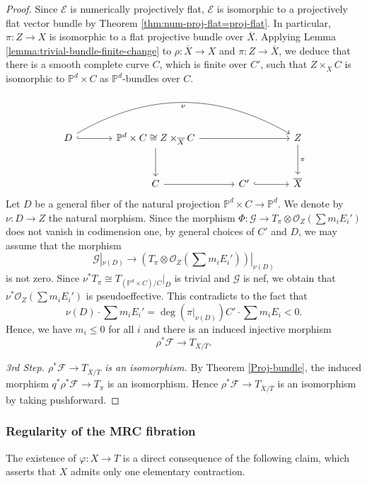 \documentclass[english,reqno]{amsart}
\newcommand\bbP{{\mathbb P}}
\newcommand\sE{{\mathscr E}}
\newcommand\sF{{\mathscr F}}
\newcommand\sG{{\mathscr G}}
\newcommand\sO{{\mathscr O}}
\theoremstyle{plain}
\theoremstyle{definition}
\numberwithin{equation}{section} %
\begin{document}
\begin{proof}
	Since $\sE$ is numerically projectively flat, $\sE$ is isomorphic to a projectively flat vector bundle by Theorem \ref{thm:num-proj-flat=proj-flat}. In particular, $\pi\colon Z\rightarrow X$ is isomorphic to a flat projective bundle over $\overline{X}$. Applying Lemma \ref{lemma:trivial-bundle-finite-change} to $\rho\colon \overline{X}\rightarrow X$ and $\pi\colon Z\rightarrow \overline{X}$, we deduce that there is a smooth complete curve $C$, which is finite over $C'$, such that  $Z\times_{\overline{X}} C$ is isomorphic to $\mathbb{P}^d\times C$ as $\bbP^d$-bundles over $C$.
	\[
	\begin{tikzcd}[column sep=large, row sep=large]
	D \arrow[bend left]{rrr}[swap]{\nu}\arrow[r,hookrightarrow] &  \mathbb{P}^d\times C \cong Z\times_{\overline{X}} C \arrow[rr] \dar & & Z \dar{\pi}\\
	& C  \rar & C' \arrow[r,hookrightarrow] &  \overline{X}
	\end{tikzcd}
	\]
	Let $D$ be a general fiber of the natural projection $\mathbb{P}^d\times C\to \mathbb{P}^d$. We denote by $\nu\colon D \to Z$ the natural morphism. Since the morphism $\Phi\colon\sG\rightarrow T_{\pi}\otimes \sO_{Z}(\sum m_i E_i')$ does not vanish in codimension one,  by general choices of $C'$ and $D$, we may assume that   the morphism $$\sG|_{\nu(D)}  \to (T_{\pi} \otimes \sO_{Z}(\sum m_iE_i'))|_{\nu(D)}$$  is not zero.
	Since $\nu^*T_{\pi} \cong T_{(\mathbb{P}^d\times C)/C}|_D$ is trivial and  $\sG$ is nef, we obtain that $\nu^* \sO_{Z}(\sum m_iE_i')$ is pseudoeffective. This contradicts to the fact that 
	$$
	\nu(D)\cdot \sum m_i E_i'=\deg(\pi\vert_{\nu(D)}) C'\cdot \sum m_iE_i <0.
	$$
	Hence, we have $m_i\leq 0$ for all $i$ and there is  an induced injective morphism 
	\[
	\rho^*\sF\rightarrow T_{\overline{X}/\overline{T}}.
	\]
	\smallskip
	
	
	\textit{3rd Step. $\rho^*\sF\rightarrow T_{\overline{X}/\overline{T}}$ is an isomorphism.} By Theorem \ref{Proj-bundle}, the induced morphism $q^*\rho^*\sF\rightarrow T_{\pi}$ is an isomorphism.  Hence   $\rho^*\sF \rightarrow T_{\overline{X}/\overline{T}}$ is   an isomorphism  by taking pushforward.
\end{proof}

\subsubsection{Regularity of the MRC fibration}

The existence of $\varphi\colon X\rightarrow T$ is a direct consequence of the following claim, which asserts that $X$ admits only one elementary contraction.
\end{document}
